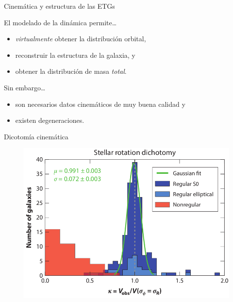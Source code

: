 \documentclass[xcolor=dvipsnames,4pt]{beamer}
\newenvironment{changemargin}[2]{%
  \begin{list}{}{%
    \setlength{\topsep}{0pt}%
    \setlength{\leftmargin}{#1}%
    \setlength{\rightmargin}{#2}%
    \setlength{\listparindent}{\parindent}%
    \setlength{\itemindent}{\parindent}%
    \setlength{\parsep}{\parskip}%
  }%
\item[]}{\end{list}}
\begin{document}
\begin{frame}{Cinemática y estructura de las ETGs}
\begin{block}{El modelado de la dinámica permite\ldots}
\begin{itemize}
\item \emph{virtualmente} obtener la distribución orbital,
\item reconstruir la estructura de la galaxia, y
\item obtener la distribución de masa \emph{total}.
\end{itemize}
\end{block}

\begin{block}{Sin embargo\ldots}
\begin{itemize}
\item son necesarios datos cinemáticos de muy buena calidad y
\item existen degeneraciones.
\end{itemize}
\end{block}
\end{frame}

\begin{frame}{Dicotomía cinemática}
\begin{changemargin}{-1cm}{-1cm}
\begin{figure}
\includegraphics[scale=0.75]{img/dicotomia.png}
\end{figure}
\end{changemargin}
\end{frame}
\end{document}
